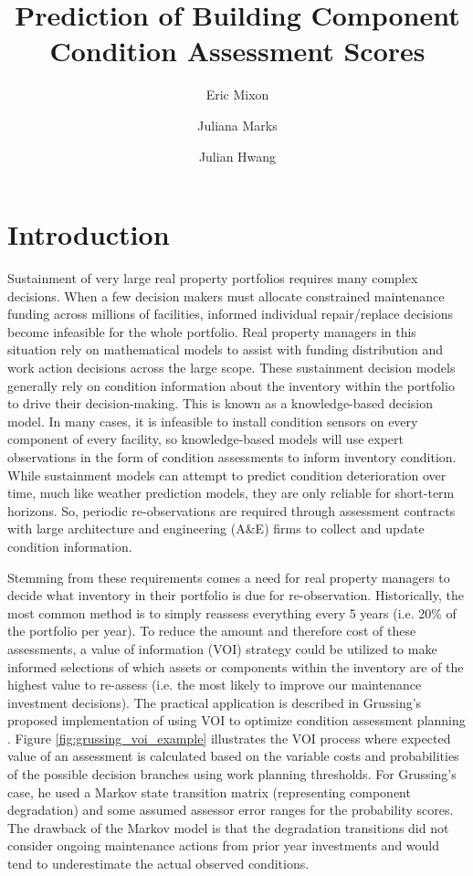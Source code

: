 \documentclass[NewProceedings,letterpaper,NoPageNumbers,NoLineNumbers, DoubleSpace]{ascelike-new}
\begin{document}
\title{Prediction of Building Component Condition Assessment Scores}

\author[1]{Eric Mixon}
\author[2]{Juliana Marks}
\author[3]{Julian Hwang}

\maketitle
\section{Introduction}

Sustainment of very large real property portfolios requires many complex decisions. When a few decision makers must allocate constrained maintenance funding across millions of facilities, informed individual repair/replace decisions become infeasible for the whole portfolio. Real property managers in this situation rely on mathematical models to assist with funding distribution and work action decisions across the large scope.  These sustainment decision models generally rely on condition information about the inventory within the portfolio to drive their decision-making. This is known as a knowledge-based decision model.  In many cases, it is infeasible to install condition sensors on every component of every facility, so knowledge-based models will use expert observations in the form of condition assessments to inform inventory condition.  While sustainment models can attempt to predict condition deterioration over time, much like weather prediction models, they are only reliable for short-term horizons. So, periodic re-observations are required through assessment contracts with large architecture and engineering (A\&E) firms to collect and update condition information.  

Stemming from these requirements comes a need for real property managers to decide what inventory in their portfolio is due for re-observation.  Historically, the most common method is to simply reassess everything every 5 years (i.e. 20\% of the portfolio per year).  To reduce the amount and therefore cost of these assessments, a value of information (VOI) strategy could be utilized to make informed selections of which assets or components within the inventory are of the highest value to re-assess (i.e. the most likely to improve our maintenance investment decisions). The practical application is described in Grussing's proposed implementation of using VOI to optimize condition assessment planning \cite{grussing2018optimized}. Figure \ref{fig:grussing_voi_example} illustrates the VOI process where expected value of an assessment is calculated based on the variable costs and probabilities of the possible decision branches using work planning thresholds.  For Grussing's case, he used a Markov state transition matrix (representing component degradation) and some assumed assessor error ranges for the probability scores. The drawback of the Markov model is that the degradation transitions did not consider ongoing maintenance actions from prior year investments and would tend to underestimate the actual observed conditions. 
\end{document}
